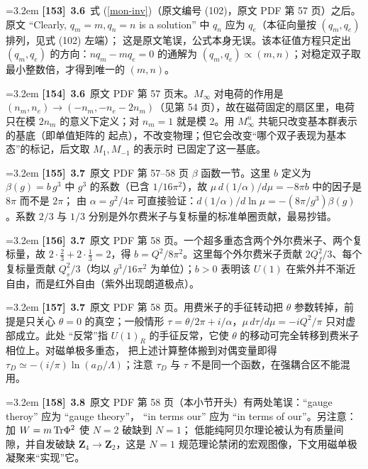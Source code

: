 \par
\par\medskip\noindent\hangindent=3.2em \textbf{[153]}~\textbf{3.6}~式 (\ref{mon-inv})（原文编号 (102)，原文 PDF 第 57 页）之后。原文 “Clearly,  $q_m=m, q_n=n$ is a solution” 中 $q_n$ 应为 $q_e$（本征向量按 $(q_m,q_e)$ 排列，见式 (102) 左端）；  这是原文笔误，公式本身无误。该本征值方程只定出 $(q_m,q_e)$ 的方向：$nq_m-mq_e=0$ 的通解为  $(q_m,q_e)\propto(m,n)$；对稳定双子取最小整数倍，才得到唯一的 $(m,n)$。
\par
\par\medskip\noindent\hangindent=3.2em \textbf{[154]}~\textbf{3.6}~原文 PDF 第 57 页末。$M_\infty$ 对电荷的作用是  $(n_m,n_e)\to(-n_m,-n_e-2n_m)$（见第 54 页），故在磁荷固定的扇区里，电荷只在模 $2n_m$  的意义下定义；对 $n_m=1$ 就是模 2。用 $M_\infty^n$ 共轭只改变基本群表示的基底（即单值矩阵的  起点），不改变物理；但它会改变“哪个双子表现为基本态”的标记，后文取 $M_1,M_{-1}$ 的表示时  已固定了这一基底。
\par
\par\medskip\noindent\hangindent=3.2em \textbf{[155]}~\textbf{3.7}~原文 PDF 第 57--58 页 $\beta$ 函数一节。这里 $b$ 定义为 $\beta(g)=b\,g^3$ 中 $g^3$  的系数（已含 $1/16\pi^2$），故 $\mu\,d(1/\alpha)/d\mu=-8\pi b$ 中的因子是 $8\pi$ 而不是 $2\pi$；  由 $\alpha=g^2/4\pi$ 可直接验证：$d(1/\alpha)/d\ln\mu=-(8\pi/g^3)\beta(g)$。系数 $2/3$ 与 $1/3$  分别是外尔费米子与复标量的标准单圈贡献，最易抄错。
\par
\par\medskip\noindent\hangindent=3.2em \textbf{[156]}~\textbf{3.7}~原文 PDF 第 58 页。一个超多重态含两个外尔费米子、两个复标量，故  $2\cdot\frac{2}{3}+2\cdot\frac{1}{3}=2$，得 $b=Q^2/8\pi^2$。这里每个外尔费米子贡献  $2Q_f^2/3$、每个复标量贡献 $Q_s^2/3$（均以 $g^3/16\pi^2$ 为单位）；$b>0$ 表明该 $U(1)$  在紫外并不渐近自由，而是红外自由（紫外出现朗道极点）。
\par
\par\medskip\noindent\hangindent=3.2em \textbf{[157]}~\textbf{3.7}~原文 PDF 第 58 页。用费米子的手征转动把 $\theta$ 参数转掉，前提是只关心 $\theta=0$  的真空；一般情形 $\tau=\theta/2\pi+i/\alpha$，$\mu\,d\tau/d\mu=-iQ^2/\pi$ 只对虚部成立。此处  “反常”指 $U(1)_R$ 的手征反常，它使 $\theta$ 的移动可完全转移到费米子相位上。对磁单极多重态，  把上述计算整体搬到对偶变量即得 $\tau_D\simeq-(i/\pi)\ln(a_D/\Lambda)$；注意 $\tau_D$ 与 $\tau$  不是同一个函数，在强耦合区不能混用。
\par
\par\medskip\noindent\hangindent=3.2em \textbf{[158]}~\textbf{3.8}~原文 PDF 第 58 页（本小节开头）有两处笔误：“gauge theroy” 应为 “gauge theory”，  “in terms our” 应为 “in terms of our”。另注意：加 $W=m\,{\rm Tr}\Phi^2$ 使 $N=2$ 破缺到 $N=1$；  低能纯阿贝尔理论被认为有质量间隙，并自发破缺 $\mathbf{Z}_4\to\mathbf{Z}_2$，这是 $N=1$  规范理论禁闭的宏观图像，下文用磁单极凝聚来“实现”它。
